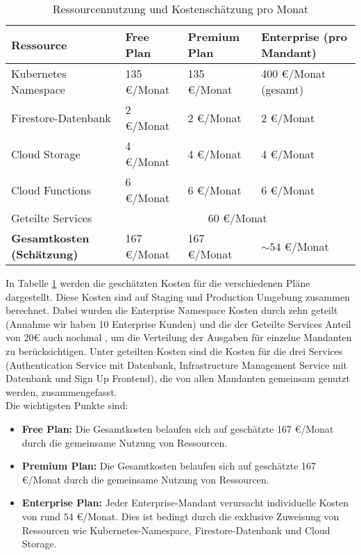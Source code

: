 \begin{table}[h!]
    \centering
    \caption{Ressourcennutzung und Kostenschätzung pro Monat}
    {
        \begin{tabularx}{\textwidth}{|l|X|X|X|}
            \hline
            \textbf{Ressource} & \textbf{Free Plan} & \textbf{Premium Plan} & \textbf{Enterprise (pro Mandant)} \\ \hline
            Kubernetes Namespace              & 135 €/Monat                      & 135 €/Monat           & 400 €/Monat (gesamt)              \\ \hline
            Firestore-Datenbank               & 2 €/Monat                        & 2 €/Monat             & 2 €/Monat                         \\ \hline
            Cloud Storage                     & 4 €/Monat                        & 4 €/Monat             & 4 €/Monat                         \\ \hline
            Cloud Functions                   & 6 €/Monat                        & 6 €/Monat             & 6 €/Monat                         \\ \hline
            Geteilte Services                 & \multicolumn{3}{c|}{ 60 €/Monat}                                                             \\ \hline
            \textbf{Gesamtkosten (Schätzung)} & 167 €/Monat                      & 167 €/Monat           & $\sim 54$ €/Monat                 \\ \hline
        \end{tabularx}}
    \label{tab:costmodel}
\end{table}

In Tabelle \ref{tab:costmodel} werden die geschätzten Kosten für die verschiedenen Pläne dargestellt.
Diese Kosten sind auf Staging und Production Umgebung zusammen berechnet.
Dabei wurden die Enterprise Namespace Kosten durch zehn geteilt (Annahme wir haben 10 Enterprise Kunden) und die der Geteilte Services Anteil von 20€ auch nochmal , um die Verteilung der Ausgaben für einzelne Mandanten zu berücksichtigen.
Unter geteilten Kosten sind die Kosten für die drei Services (Authentication Service mit Datenbank, Infrastructure Management Service mit Datenbank und Sign Up Frontend), die von allen Mandanten gemeinsam genutzt werden, zusammengefasst.
\\
Die wichtigsten Punkte sind:
\begin{itemize}
	\item \textbf{Free Plan:} Die Gesamtkosten belaufen sich auf geschätzte 167 €/Monat durch die gemeinsame Nutzung von Ressourcen.
	\item \textbf{Premium Plan:} Die Gesamtkosten belaufen sich auf geschätzte 167 €/Monat durch die gemeinsame Nutzung von Ressourcen.
	\item \textbf{Enterprise Plan:} Jeder Enterprise-Mandant verursacht individuelle Kosten von rund 54 €/Monat. Dies ist bedingt durch die exklusive Zuweisung von Ressourcen wie Kubernetes-Namespace, Firestore-Datenbank und Cloud Storage.
\end{itemize}

